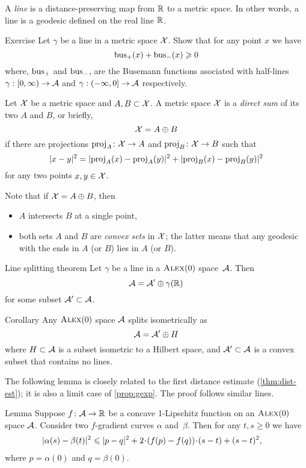 A \emph{line} is a distance-preserving map
from $\RR$ to a metric space.
In other words, a line is a geodesic defined on the real line $\RR$.

\begin{thm}{Exercise}\label{ex:bus+bus}
Let $\gamma$ be a line in a metric space $\spc{X}$.
Show that for any point $x$ we have
\[\bus_+(x)+\bus_-(x)\ge 0\]
where, $\bus_+$ and $\bus_-$, are the Busemann functions asociated with half-lines $\gamma:[0,\infty)\to \spc{A}$ and $\gamma:(-\infty,0]\to \spc{A}$ respectively.
\end{thm}


Let $\spc{X}$ be a metric space and $A,B\subset \spc{X}$.
A metric space $\spc{X}$ is a \emph{direct sum} of its two $A$ and $B$,
or briefly,
\[\spc{X}=A\oplus B\]
if there are projections $\proj_A\:\spc{X}\to A$ 
and 
$\proj_B\:\spc{X}\to B$
such that 
\[\dist[2]{x}{y}{}=\dist[2]{\proj_A(x)}{\proj_A(y)}{}+\dist[2]{\proj_B(x)}{\proj_B(y)}{}\]
for any two points $x,y\in \spc{X}$.

Note that if $\spc{X}=A\oplus B$, then 
\begin{itemize}
\item $A$ intersects $B$ at a single point,
\item both sets $A$ and $B$ are \emph{convex sets} in $\spc{X}$;
the latter means that any geodesic with the ends in $A$ (or $B$) lies in $A$ (or $B$). 
\end{itemize}

\begin{thm}{Line splitting theorem}\label{thm:splitting}
Let $\gamma$ be a line in a $\Alex0$ space~$\spc{A}$. 
Then 
\[\spc{A}=\spc{A}'\oplus \gamma(\RR)\]
for some subset $\spc{A}'\subset \spc{A}$.
\end{thm}

\begin{thm}{Corollary}\label{cor:splitting}
Any $\Alex0$ space $\spc{A}$ splits isometrically as
\[
\spc{A}=\spc{A}'\oplus H
\]
where $H\subset \spc{A}$ is a subset isometric to a Hilbert space, and $\spc{A}'\subset \spc{A}$ is a convex subset that contains no lines. 
\end{thm}

The following lemma is closely related to the first distance estimate (\ref{thm:dist-est});
it is also a limit case of \ref{prop:gexp}.
The proof follows similar  lines.

\begin{thm}{Lemma}\label{lem:dist-estimate}
Suppose $f\:\spc{A}\to\RR$ be a concave 1-Lipschitz function on an $\Alex0$ space $\spc{A}$.
Consider two $f$-gradient curves $\alpha$ and~$\beta$.
Then for any $t, s\ge 0$ we have
\begin{align*}
&\dist[2]{\alpha(s)}{\beta(t)}{}
\le 
\dist[2]{p}{q}{}+
2\cdot(f(p)-f(q))\cdot(s-t)+ (s-t)^2,
\end{align*}
where $p=\alpha(0)$ and $q=\beta(0)$.
\end{thm}

